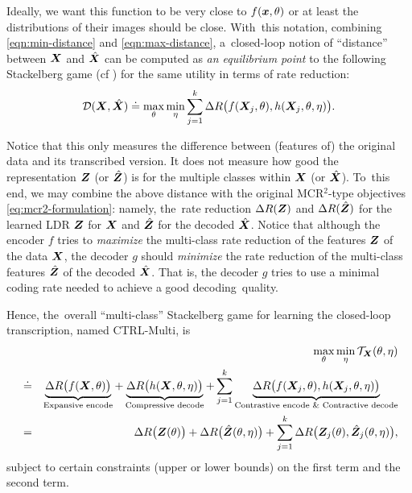 \documentclass[../../book-main.tex]{subfiles}
\begin{document}
Ideally, we want this function to be very close to $f(\bm{x}, \theta)$ or at least the distributions of their images should be close. With~this notation, combining \eqref{eqn:min-distance} and \eqref{eqn:max-distance}, a~closed-loop notion of ``distance'' between $\bm{X}$ and $\hat {\bm{X}}$ can be computed as {\em an equilibrium point} to the following Stackelberg game (cf ) for the same utility in terms of rate reduction:%
\begin{equation}
\mathcal{D}(\bm{X}, \hat {\bm{X}}) \doteq  \max_\theta \min_\eta \sum_{j=1}^k \Delta R\big(f(\bm{X}_j,\theta), h(\bm{X}_j,\theta,\eta)\big).
    \label{eq:MCR2-GAN-pair}
\end{equation}

Notice that this only measures the difference between (features of) the original data and its transcribed version. It does not measure how good the representation $\bm{Z}$ (or $\hat {\bm{Z}}$) is for the multiple classes within $\bm{X}$ (or $\hat {\bm{X}}$). To~this end, we may combine the above distance with the original MCR$^2$-type objectives  \eqref{eq:mcr2-formulation}: namely, the~rate reduction $\Delta R(\bm{Z})$ and $\Delta R(\hat {\bm{Z}})$ for the learned LDR $\bm{Z}$ for $\bm{X}$ and $\hat {\bm{Z}}$ for the decoded $\hat {\bm{X}}$. Notice that although the encoder $f$ tries to {\em maximize} the multi-class rate reduction of the features $\bm{Z}$ of the data $\bm{X}$,  the decoder $g$ should {\em minimize} the rate reduction of the multi-class  features $\hat {\bm{Z}}$ of the decoded $\hat {\bm{X}}$. That is, the decoder $g$ tries to use a minimal  coding rate needed to achieve a good decoding~quality. 

Hence, the~overall ``multi-class''  Stackelberg game for learning the closed-loop transcription, named CTRL-Multi, is
\begin{eqnarray}
&&\max_\theta \min_\eta \mathcal{T}_{\bm{X}}(\theta, \eta) \\
&\doteq& \underbrace{\Delta R\big(f(\bm{X},\theta)\big)}_{\text{Expansive encode}} + \underbrace{\Delta R\big(h(\bm{X},\theta, \eta)\big)}_{\text{Compressive decode}} + \sum_{j=1}^k \underbrace{\Delta R\big(f(\bm{X}_j,\theta), h(\bm{X}_j,\theta,\eta)\big)}_{\text{Contrastive encode \& Contractive decode}} \nonumber \\
&=& \Delta R\big(\bm{Z}(\theta) \big) + \Delta R\big(\hat {\bm{Z}}(\theta, \eta)\big) + \sum_{j=1}^k \Delta R\big(\bm{Z}_j(\theta), \hat {\bm{Z}}_j(\theta, \eta) \big),
    \label{eq:MCR2-GAN-objective}
\end{eqnarray}
subject to certain constraints (upper or lower bounds) on the first term and the second term.  %
\end{document}
